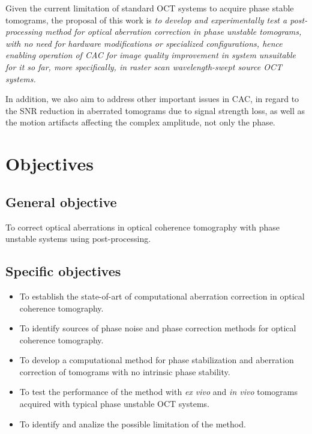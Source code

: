 Given the current limitation of standard OCT systems to acquire phase stable tomograms, the proposal of this work is \textit{to develop and experimentally test a post-processing method for optical aberration correction in phase unstable tomograms, with no need for hardware modifications or specialized configurations, hence enabling operation of CAC for image quality improvement in system unsuitable for it so far, more specifically, in raster scan wavelength-swept source OCT systems.}

In addition, we also aim to address other important issues in CAC, in regard to the SNR reduction in aberrated tomograms due to signal strength loss, as well as the motion artifacts affecting the complex amplitude, not only the phase.

\newpage
\section{Objectives}
\vspace{\baselineskip}
\subsection{General objective}

To correct optical aberrations in optical coherence tomography with phase unstable systems using post-processing.

\subsection{Specific objectives}

\begin{itemize}
    \item To establish the state-of-art of computational aberration correction in optical coherence tomography.
    \item To identify sources of phase noise and phase correction methods for optical coherence tomography.
    \item To develop a computational method for phase stabilization and aberration correction of tomograms with no intrinsic phase stability.
    \item To test the performance of the method with \textit{ex vivo} and \textit{in vivo} tomograms acquired with typical phase unstable OCT systems.
    \item To identify and analize the possible limitation of the method.
\end{itemize}

